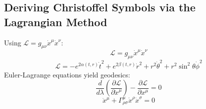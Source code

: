\documentclass[11pt, a4paper]{report}
\begin{document}
\subsection*{Deriving Christoffel Symbols via the Lagrangian Method}
Using $\mathcal{L} = g_{\mu\nu} \dot{x}^\mu \dot{x}^\nu$:
\begin{equation}
\mathcal{L} = g_{\mu\nu} \dot{x}^\mu \dot{x}^\nu
\end{equation}
\begin{equation}
\mathcal{L} = -e^{2\alpha(t,r)} \dot{t}^2 + e^{2\beta(t,r)} \dot{r}^2 + r^2 \dot{\theta}^2 + r^2 \sin^2\theta \dot{\phi}^2
\end{equation}
Euler-Lagrange equations yield geodesics:
\begin{equation}
\frac{d}{d\lambda} \left( \frac{\partial \mathcal{L}}{\partial \dot{x}^\mu} \right) - \frac{\partial \mathcal{L}}{\partial x^\mu} = 0 \label{eq:EL_general}
\end{equation}
\begin{equation}
\ddot{x}^\mu + \Gamma^\mu_{\rho\sigma} \dot{x}^\rho \dot{x}^\sigma = 0 \label{eq:geodesic_general}
\end{equation}
\end{document}
